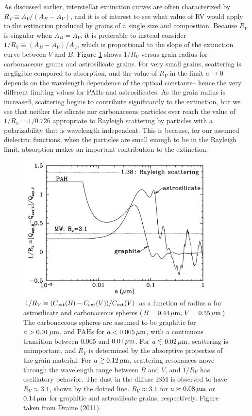 \documentclass[a4paper,10pt]{article}
\begin{document}
{\noindent}As discussed earlier, interstellar extinction curves are often characterized by $R_V\equiv A_V/(A_B-A_V)$, and it is of interest to see what value of RV would apply to the extinction produced by grains of a single size and composition. Because $R_V$ is singular when $A_B=A_V$, it is preferable to instead consider $1/R_V \equiv (A_B-A_V)/A_V$, which is proportional to the slope of the extinction curve between $V$ and $B$. Figure \ref{fig:RVinv} shows $1/R_V$ versus grain radius for carbonaceous grains and astrosilicate grains. For very small grains, scattering is negligible compared to absorption, and the value of $R_V$ in the limit $a\rightarrow0$ depends on the wavelength dependence of the optical constants-- hence the very different limiting values for PAHs and astrosilicates. As the grain radius is increased, scattering begins to contribute significantly to the extinction, but we see that neither the silicate nor carbonaceous particles ever reach the value of $1/R_V=1/0.726$ appropriate to Rayleigh scattering by particles with a polarizability that is wavelength independent. This is because, for our assumed dielectric functions, when the particles are small enough to be in the Rayleigh limit, absorption makes an important contribution to the extinction.

\begin{figure}[t]
    \centering
    \includegraphics[width=10cm]{figures/RV_inv.png}
    \caption{\footnotesize{$1/R_V \equiv (C_{\rm ext}(B) - C_{\rm ext}(V))/C_{\rm ext}(V)$ as a function of radius a for astrosilicate and carbonaceous spheres ($B=0.44\,\mu{\rm m},\,V=0.55\,\mu{\rm m}$). The carbonaceous spheres are assumed to be graphitic for $a>0.01\,\mu{\rm m}$, and PAHs for $a<0.005\,\mu{\rm m}$, with a continuous transition between $0.005$ and $0.01\,\mu{\rm m}$. For $a\lesssim0.02\,\mu{\rm m}$, scattering is unimportant, and $R_V$ is determined by the absorptive properties of the grain material. For $a\gtrsim0.12\,\mu{\rm m}$, scattering resonances move through the wavelength range between $B$ and $V$, and $1/R_V$ has oscillatory behavior. The dust in the diffuse ISM is observed to have $R_V\approx3.1$, shown by the dotted line. $R_V\approx3.1$ for $a\approx0.08\,\mu{\rm m}$ or $0.14\,\mu{\rm m}$ for graphitic and astrosilicate grains, respectively. Figure taken from Draine (2011).}}
    \label{fig:RVinv}
\end{figure}
\end{document}
